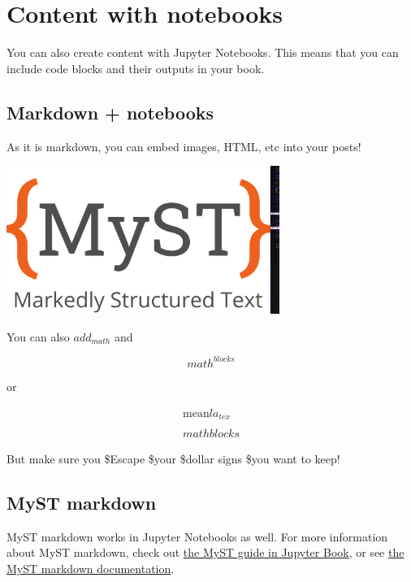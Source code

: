     \hypertarget{content-with-notebooks}{%
\section{Content with notebooks}\label{content-with-notebooks}}

You can also create content with Jupyter Notebooks. This means that you
can include code blocks and their outputs in your book.

\hypertarget{markdown-notebooks}{%
\subsection{Markdown + notebooks}\label{markdown-notebooks}}

As it is markdown, you can embed images, HTML, etc into your posts!

\includegraphics[width=3.5in]{fig/myST.png}

You can also \(add_{math}\) and

\[
math^{blocks}
\]

or

\[
\begin{aligned}
\mbox{mean} la_{tex} \\ \\
math blocks
\end{aligned}
\]

But make sure you \$Escape \$your \$dollar signs \$you want to keep!

\hypertarget{myst-markdown}{%
\subsection{MyST markdown}\label{myst-markdown}}

MyST markdown works in Jupyter Notebooks as well. For more information
about MyST markdown, check out
\href{https://jupyterbook.org/content/myst.html}{the MyST guide in
Jupyter Book}, or see
\href{https://myst-parser.readthedocs.io/en/latest/}{the MyST markdown
documentation}.

